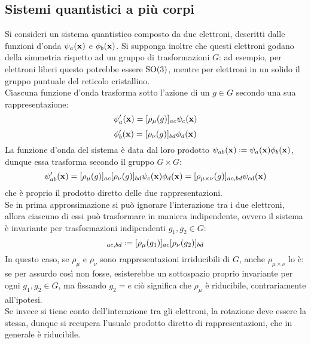 \subsection{Sistemi quantistici a più corpi}

Si consideri un sistema quantistico composto da due elettroni, descritti dalle funzioni d'onda $ \psi_a(\mathbf{x}) $ e $ \phi_b(\mathbf{x}) $. Si supponga inoltre che questi elettroni godano della simmetria rispetto ad un gruppo di trasformazioni $ G $: ad esempio, per elettroni liberi questo potrebbe essere $ \mathrm{SO}(3) $, mentre per elettroni in un solido il gruppo puntuale del reticolo cristallino.\\
Ciascuna funzione d'onda trasforma sotto l'azione di un $ g \in G $ secondo una sua rappresentazione:
\begin{equation*}
	\psi'_a(\mathbf{x}) = [\rho_{\mu}(g)]_{ac} \psi_c(\mathbf{x})
\end{equation*}
\begin{equation*}
	\phi'_b(\mathbf{x}) = [\rho_{\nu}(g)]_{bd} \phi_d(\mathbf{x})
\end{equation*}
La funzione d'onda del sistema è data dal loro prodotto $ \psi_{ab}(\ve{x}) \defeq \psi_a(\ve{x}) \phi_b(\ve{x}) $, dunque essa trasforma secondo il gruppo $ G \times G $:
\begin{equation*}
	\psi'_{ab}(\mathbf{x}) = [\rho_{\mu}(g)]_{ac} [\rho_{\nu}(g)]_{bd} \psi_c(\mathbf{x}) \phi_d(\mathbf{x}) = [\rho_{\mu \times \nu}(g)]_{ac,bd} \psi_{cd}(\mathbf{x})
\end{equation*}
che è proprio il prodotto diretto delle due rappresentazioni.\\
Se in prima approssimazione si può ignorare l'interazione tra i due elettroni, allora ciascuno di essi può trasformare in maniera indipendente, ovvero il sistema è invariante per trasformazioni indipendenti $ g_1,g_2 \in G $:
\begin{equation*}
	[\rho_{\mu \times \nu}(g_1,g_2)]_{ac,bd} \defeq [\rho_{\mu}(g_1)]_{ac} [\rho_{\nu}(g_2)]_{bd}
\end{equation*}
In questo caso, se $ \rho_{\mu} $ e $ \rho_{\nu} $ sono rappresentazioni irriducibili di $ G $, anche $ \rho_{\mu \times \nu} $ lo è: se per assurdo così non fosse, esisterebbe un sottospazio proprio invariante per ogni $ g_1,g_2 \in G $, ma fissando $ g_2 = e $ ciò significa che $ \rho_{\mu} $ è riducibile, contrariamente all'ipotesi.\\
Se invece si tiene conto dell'interazione tra gli elettroni, la rotazione deve essere la stessa, dunque si recupera l'usuale prodotto diretto di rappresentazioni, che in generale è riducibile.

